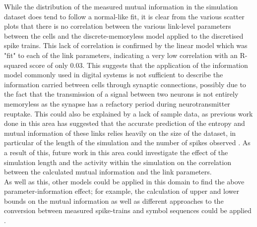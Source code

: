 \documentclass[letterpaper, 10 pt, conference]{ieeeconf}  %
\begin{document}
While the distribution of the measured mutual information in the simulation dataset does tend to follow a normal-like fit, it is clear from the various scatter plots that there is no correlation between the various link-level parameters between the cells and the discrete-memoryless model applied to the discretised spike trains. This lack of correlation is confirmed by the linear model which was "fit" to each of the link parameters, indicating a very low correlation with an R-squared score of only 0.03. This suggests that the application of the information model commonly used in digital systems is not sufficient to describe the information carried between cells through synaptic connections, possibly due to the fact that the transmission of a signal between two neurons is not entirely memoryless as the synapse has a refactory period during neurotransmitter reuptake. This could also be explained by a lack of sample data, as previous work done in this area has suggested that the accurate prediction of the entropy and mutual information of these links relies heavily on the size of the dataset, in particular of the length of the simulation and the number of spikes observed \cite{spikeTrainInfo}. As a result of this, future work in this area could investigate the effect of the simulation length and the activity within the simulation on the correlation between the calculated mutual information and the link parameters.\\
As well as this, other models could be applied in this domain to find the above parameter-information effect; for example, the calculation of upper and lower bounds on the mutual information as well as different approaches to the conversion between measured spike-trains and symbol sequences could be applied \cite{spikeTrainInfo}.
\end{document}
